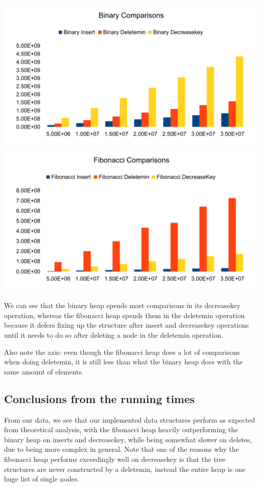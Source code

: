 \includegraphics[width=\textwidth]{graphs/bin_comp.pdf}
\includegraphics[width=\textwidth]{graphs/fib_comp.pdf}

We can see that the binary heap spends most comparisons in its decreasekey operation, whereas the fibonacci heap spends them in the deletemin operation because it defers fixing up the structure after insert and decreasekey operations until it needs to do so after deleting a node in the deletemin operation.

Also note the axis: even though the fibonacci heap does a lot of comparisons when doing deletemin, it is still less than what the binary heap does with the same amount of elements.

\subsection{Conclusions from the running times}
From our data, we see that our implemented data structures perform as expected from theoretical analysis, with the fibonacci heap heavily outperforming the  binary heap on inserts and decreasekey, while being somewhat slower on deletes, due to being more complex in  general.
Note that one of the reasons why the fibonacci heap performs exceedingly well on decreasekey is that the tree structures are never constructed by a deletemin, instead the entire heap is one huge list of single nodes. 


